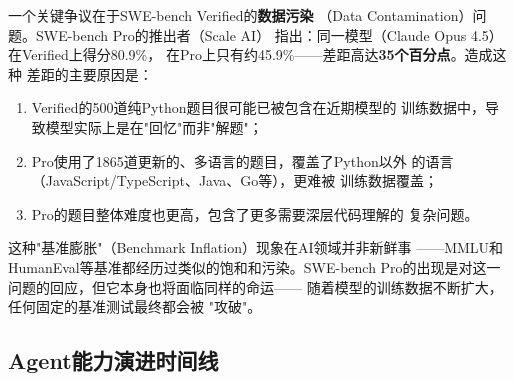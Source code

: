 一个关键争议在于SWE-bench Verified的\textbf{数据污染}
（Data Contamination）问题。SWE-bench Pro的推出者（Scale AI）
指出：同一模型（Claude Opus 4.5）在Verified上得分80.9\%，
在Pro上只有约45.9\%——差距高达\textbf{35个百分点}。造成这种
差距的主要原因是：

\begin{enumerate}
  \item Verified的500道纯Python题目很可能已被包含在近期模型的
    训练数据中，导致模型实际上是在"回忆"而非"解题"；
  \item Pro使用了1865道更新的、多语言的题目，覆盖了Python以外
    的语言（JavaScript/TypeScript、Java、Go等），更难被
    训练数据覆盖；
  \item Pro的题目整体难度也更高，包含了更多需要深层代码理解的
    复杂问题。
\end{enumerate}

这种"基准膨胀"（Benchmark Inflation）现象在AI领域并非新鲜事
——MMLU和HumanEval等基准都经历过类似的饱和和污染。SWE-bench
Pro的出现是对这一问题的回应，但它本身也将面临同样的命运——
随着模型的训练数据不断扩大，任何固定的基准测试最终都会被
"攻破"。

\subsection{Agent能力演进时间线}
\label{subsec:swebench-timeline}

